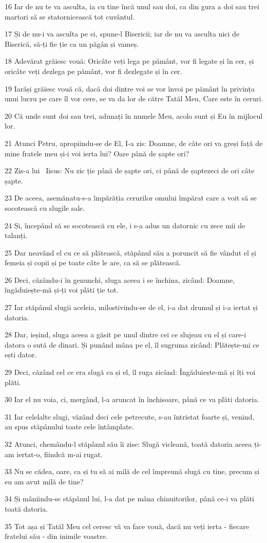 \par 16 Iar de nu te va asculta, ia cu tine încă unul sau doi, ca din gura a doi sau trei martori să se statornicească tot cuvântul.
\par 17 Și de nu-i va asculta pe ei, spune-l Bisericii; iar de nu va asculta nici de Biserică, să-ți fie ție ca un păgân și vameș.
\par 18 Adevărat grăiesc vouă: Oricâte veți lega pe pământ, vor fi legate și în cer, și oricâte veți dezlega pe pământ, vor fi dezlegate și în cer.
\par 19 Iarăși grăiesc vouă că, dacă doi dintre voi se vor învoi pe pământ în privința unui lucru pe care îl vor cere, se va da lor de către Tatăl Meu, Care este în ceruri.
\par 20 Că unde sunt doi sau trei, adunați în numele Meu, acolo sunt și Eu în mijlocul lor.
\par 21 Atunci Petru, apropiindu-se de El, I-a zis: Doamne, de câte ori va greși față de mine fratele meu și-i voi ierta lui? Oare până de șapte ori?
\par 22 Zis-a lui  Iisus: Nu zic ție până de șapte ori, ci până de șaptezeci de ori câte șapte.
\par 23 De aceea, asemănatu-s-a împărăția cerurilor omului împărat care a voit să se socotească cu slugile sale.
\par 24 Și, începând să se socotească cu ele, i s-a adus un datornic cu zece mii de talanți.
\par 25 Dar neavând el cu ce să plătească, stăpânul său a poruncit să fie vândut el și femeia și copii și pe toate câte le are, ca să se plătească.
\par 26 Deci, căzându-i în genunchi, sluga aceea i se închina, zicând: Doamne, îngăduiește-mă și-ți voi plăti ție tot.
\par 27 Iar stăpânul slugii aceleia, milostivindu-se de el, i-a dat drumul și i-a iertat și datoria.
\par 28 Dar, ieșind, sluga aceea a găsit pe unul dintre cei ce slujeau cu el și care-i datora o sută de dinari. Și punând mâna pe el, îl sugruma zicând: Plătește-mi ce ești dator.
\par 29 Deci, căzând cel ce era slugă ca și el, îl ruga zicând: Îngăduiește-mă și îți voi plăti.
\par 30 Iar el nu voia, ci, mergând, l-a aruncat în închisoare, până ce va plăti datoria.
\par 31 Iar celelalte slugi, văzând deci cele petrecute, s-au întristat foarte și, venind, au spus stăpânului toate cele întâmplate.
\par 32 Atunci, chemându-l stăpânul său îi zise: Slugă vicleană, toată datoria aceea ți-am iertat-o, fiindcă m-ai rugat.
\par 33 Nu se cădea, oare, ca și tu să ai milă de cel împreună slugă cu tine, precum și eu am avut milă de tine?
\par 34 Și mâniindu-se stăpânul lui, l-a dat pe mâna chinuitorilor, până ce-i va plăti toată datoria.
\par 35 Tot așa și Tatăl Meu cel ceresc vă va face vouă, dacă nu veți ierta - fiecare fratelui său - din inimile voastre.

